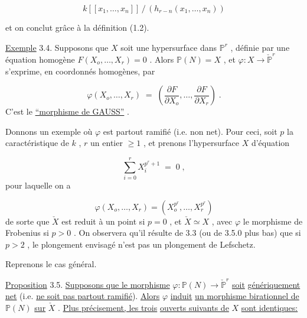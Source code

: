 \begin{equation}\tag{3.3.16}
k[[x_1,\dots,x_n]] \,/\, (h_{r-n}(x_1,\dots,x_n)) 
\end{equation}


 et on conclut grâce à la définition (1.2).

\underline{Exemple} 3.4. Supposons que $X$ soit une hypersurface dans $\mathbb{P}^r$ , définie par une équation homogène $F(X_o,\dots,X_r) = 0$ . Alors $\mathbb{P}(N) = X$ , et $\varphi : X \longrightarrow \check{\mathbb{P}}^r$ s'exprime, en coordonnés homogènes, par

\begin{equation}\tag{3.4.1}
\varphi(X_o,\dots,X_r) \;=\; \left( \frac{\partial F}{\partial X_o},\dots, \frac{\partial F}{\partial X_r} \right) \;.
\end{equation}
C'est le \underline{``morphisme de GAUSS''} .

Donnons un exemple où $\varphi$ est partout ramifié (i.e. non net). Pour ceci, soit $p$ la caractéristique de $k$ , $r$ un entier $\geqslant 1$ , et prenons l'hypersurface $X$ d'équation

\begin{equation}\tag{3.4.2}
\sum_{i=0}^{r} X_i^{p^r+1} \;=\; 0 \;,
\end{equation}
pour laquelle on a

\begin{equation}\tag{3.4.3}
\varphi(X_o,\dots,X_r) = (X_o^{p^r},\dots,X_r^{p^r})
\end{equation}
de sorte que $\check{X}$ est reduit à un point si $p = 0$ , et $\check{X} \simeq X$ , avec $\varphi$ le morphisme de Frobenius si $p > 0$ . On observera qu'il résulte de 3.3 (ou de 3.5.0 plus bas) que si $p > 2$ , le plongement envisagé n'est pas un plongement de Lefschetz.

Reprenons le cas général.



\underline{Proposition} 3.5. \underline{Supposons que le morphisme} $\varphi : \mathbb{P}(N) \longrightarrow \check{\mathbb{P}}^r$ \underline{soit} \underline{génériquement net} (i.e. \underline{ne soit pas partout ramifié}). \underline{Alors} $\varphi$ \underline{induit} \underline{un morphisme birationnel de} $\mathbb{P}(N)$ \underline{sur} $\check{X}$ . \underline{Plus précisement, les trois} \underline{ouverts suivants de} $X$ \underline{sont identiques:}

